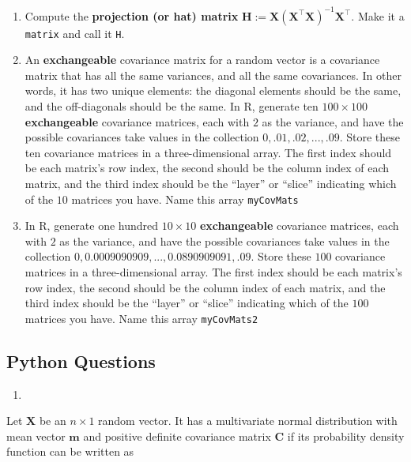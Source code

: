 \documentclass[
  12pt,
  krantz2]{krantz}
\providecommand{\tightlist}{%
  \setlength{\itemsep}{0pt}\setlength{\parskip}{0pt}}
\begin{document}
\begin{enumerate}
\def\labelenumi{\alph{enumi})}
\item
  Compute the \textbf{projection (or hat) matrix} \(\mathbf{H} := \mathbf{X}\left(\mathbf{X}^\intercal \mathbf{X}\right)^{-1} \mathbf{X}^\intercal\). Make it a \texttt{matrix} and call it \texttt{H}.
\item
  An \textbf{exchangeable} covariance matrix for a random vector is a covariance matrix that has all the same variances, and all the same covariances. In other words, it has two unique elements: the diagonal elements should be the same, and the off-diagonals should be the same. In R, generate ten \(100 \times 100\) \textbf{exchangeable} covariance matrices, each with \(2\) as the variance, and have the possible covariances take values in the collection \(0,.01,.02, ..., .09.\) Store these ten covariance matrices in a three-dimensional array. The first index should be each matrix's row index, the second should be the column index of each matrix, and the third index should be the ``layer'' or ``slice'' indicating which of the \(10\) matrices you have. Name this array \texttt{myCovMats}
\item
  In R, generate one hundred \(10 \times 10\) \textbf{exchangeable} covariance matrices, each with \(2\) as the variance, and have the possible covariances take values in the collection \(0,0.0009090909, ..., 0.0890909091, .09.\) Store these \(100\) covariance matrices in a three-dimensional array. The first index should be each matrix's row index, the second should be the column index of each matrix, and the third index should be the ``layer'' or ``slice'' indicating which of the \(100\) matrices you have. Name this array \texttt{myCovMats2}
\end{enumerate}

\hypertarget{python-questions-2}{%
\subsection{Python Questions}\label{python-questions-2}}

\begin{enumerate}
\def\labelenumi{\arabic{enumi}.}
\tightlist
\item
\end{enumerate}

Let \(\mathbf{X}\) be an \(n \times 1\) random vector. It has a multivariate normal distribution with mean vector \(\mathbf{m}\) and positive definite covariance matrix \(\mathbf{C}\) if its probability density function can be written as
\end{document}
